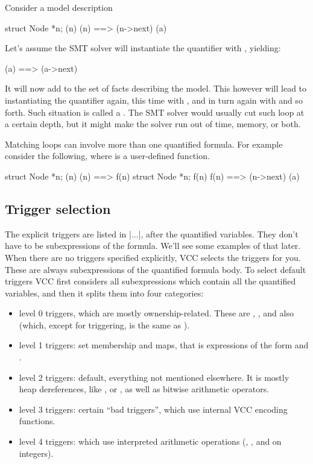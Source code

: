 Consider a model description
\begin{VCC}
\forall struct Node *n; {\mine(n)} \mine(n) ==> \mine(n->next)
\mine(a)
\end{VCC}
Let's assume the SMT solver will instantiate the quantifier with , yielding:
\begin{VCC}
\mine(a) ==> \mine(a->next)
\end{VCC}
It will now add  to the set of facts
describing the model.
This however will lead to instantiating the quantifier again,
this time with , and in turn again with
 and so forth.
Such situation is called a .
The SMT solver would usually cut such loop at a certain depth,
but it might make the solver run out of time, memory, or both.

Matching loops can involve more than one quantified formula. 
For example consider the following, where  is a user-defined function.
\begin{VCC}
\forall struct Node *n; {\mine(n)} \mine(n) ==> f(n)
\forall struct Node *n; {f(n)} f(n) ==> \mine(n->next)
\mine(a)
\end{VCC}


\subsection{Trigger selection}
\label{sect:trigger-inference}


The explicit triggers are listed in \vcc|{...}|, after the quantified variables.
They don't have to be subexpressions of the formula. 
We'll see some examples of that later.
When there are no triggers specified explicitly, VCC selects the triggers for you.
These are always subexpressions of the quantified formula body.
To select default triggers VCC first considers all subexpressions which contain all the quantified variables,
and then it splits them into four categories:
\begin{itemize}
\item level 0 triggers, which are mostly ownership-related. 
These are , , and also  (which, except for triggering, is the same as ).
\item level 1 triggers: set membership and maps, that is expressions of 
the form  and .
\item level 2 triggers: default, \ie everything not mentioned elsewhere. 
It is mostly heap dereferences, like ,  or , as well as bitwise arithmetic operators.
\item level 3 triggers: certain ``bad triggers'', which use internal VCC encoding functions.
\item level 4 triggers: which use interpreted arithmetic operations (\vcc{+}, \vcc{-}, and \vcc{*} on integers).
\end{itemize}

